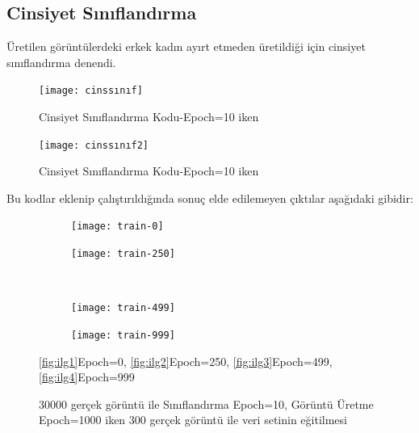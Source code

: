 \documentclass[12pt, a4paper]{article}
\begin{document}
	\subsection{Cinsiyet Sınıflandırma}
	Üretilen görüntülerdeki erkek kadın ayırt etmeden üretildiği için cinsiyet sınıflandırma denendi.
	\begin{figure}[h]
		\centering
		\texttt{[image: cinssınıf]}
		\label{cinssınıf}
		\caption{Cinsiyet Sınıflandırma Kodu-Epoch=10 iken\cite{ChatGPT-2024-05-29}}
	\end{figure}
	
	\begin{figure}[h]
		\centering
		\texttt{[image: cinssınıf2]}
		\label{cinssınıf2}
		\caption{Cinsiyet Sınıflandırma Kodu-Epoch=10 iken\cite{ChatGPT-2024-05-29}}
	\end{figure}
	
	Bu kodlar eklenip çalıştırıldığında sonuç elde edilemeyen çıktılar aşağıdaki gibidir:
	
	\begin{figure}[htbp]
		\centering
		\begin{subfigure}{0.40\textwidth}
			\centering
			\texttt{[image: train-0]}
			\caption{}
			\label{fig:ilg1}
		\end{subfigure}
		\hfill
		\begin{subfigure}{0.40\textwidth}
			\centering
			\texttt{[image: train-250]}
			\caption{}
			\label{fig:ilg2}
		\end{subfigure}
		\\
		\begin{subfigure}{0.40\textwidth}
			\centering
			\texttt{[image: train-499]}
			\caption{}
			\label{fig:ilg3}
		\end{subfigure}
		\hfill
		\begin{subfigure}{0.40\textwidth}
			\centering
			\texttt{[image: train-999]}
			\caption{}
			\label{fig:ilg4}
		\end{subfigure}
		\caption{30000 gerçek görüntü ile Sınıflandırma Epoch=10, Görüntü Üretme Epoch=1000 iken 300 gerçek görüntü ile veri setinin eğitilmesi}
		\label{fig:fouur_images}
		\eqref{fig:ilg1}Epoch=0,
		\eqref{fig:ilg2}Epoch=250,
		\eqref{fig:ilg3}Epoch=499,
		\eqref{fig:ilg4}Epoch=999
	\end{figure}
	\FloatBarrier
	
\end{document}
